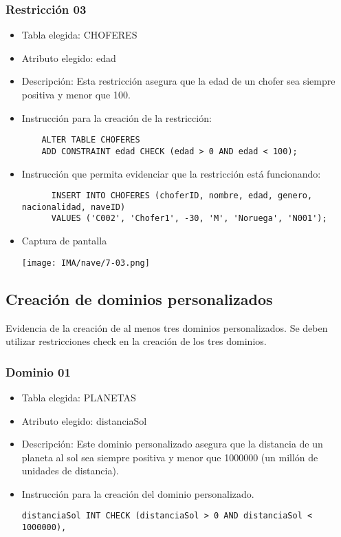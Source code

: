 \subsubsection*{Restricción 03}

\begin{itemize} 
  \item Tabla elegida: CHOFERES 
  \item Atributo elegido: edad 
  \item Descripción: Esta restricción asegura que la edad de un chofer sea siempre positiva y menor que 100. 
  \item Instrucción para la creación de la restricción: 
    \begin{verbatim} 
    ALTER TABLE CHOFERES
    ADD CONSTRAINT edad CHECK (edad > 0 AND edad < 100); 
    \end{verbatim} 
  \item Instrucción que permita evidenciar que la restricción está funcionando: 
    \begin{verbatim}
      INSERT INTO CHOFERES (choferID, nombre, edad, genero, nacionalidad, naveID) 
      VALUES ('C002', 'Chofer1', -30, 'M', 'Noruega', 'N001');
    \end{verbatim} 
  \item Captura de pantalla 
    \begin{center}
      \texttt{[image: IMA/nave/7-03.png]}
    \end{center} 
\end{itemize}


\subsection{Creación de dominios personalizados}

Evidencia de la creación de al menos tres dominios personalizados. Se deben utilizar restricciones check en la creación de los tres dominios.

\subsubsection*{Dominio 01}

\begin{itemize} 
  \item Tabla elegida: PLANETAS 
  \item Atributo elegido: distanciaSol 
  \item Descripción: Este dominio personalizado asegura que la distancia de un planeta al sol sea siempre positiva y menor que 1000000 (un millón de unidades de distancia). 
  \item Instrucción para la creación del dominio personalizado. 
  \begin{lstlisting}[caption={Dominio 01}, label={lst:sql_estadios}] 
    distanciaSol INT CHECK (distanciaSol > 0 AND distanciaSol < 1000000),
  \end{lstlisting} 
\end{itemize}

